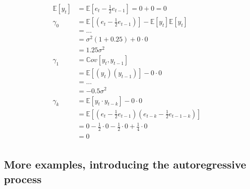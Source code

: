\begin{equation*}
    \begin{aligned}
        \mathbb{E}[y_t] &= \mathbb{E}[e_t - \frac{1}{2}e_{t-1}] = 0 + 0 = 0 \\
        \gamma_0 &= \mathbb{E}[\left( e_t - \frac{1}{2}e_{t-1}\right)] - \mathbb{E}[y_t] \mathbb{E}[y_t]  \\
                 &= \dots \\
                 &= \sigma^2(1 + 0.25) + 0 \cdot 0 \\
                 &= 1.25 \sigma^2 \\
        \gamma_1 &= \mathbb{C}ov[y_t, y_{t-1}] \\
                 &= \mathbb{E}[\left( y_t \right) \left( y_{t-1}\right)] -
                 0 \cdot 0\\
                 &= \dots \\
                 &= -0.5\sigma^2 \\
        \gamma_k &= \mathbb{E}[y_t \cdot y_{t-k}]  - 0 \cdot 0\\
                 &= \mathbb{E}[\left( e_t - \frac{1}{2}e_{t-1} \right) \left(
                 e_{t-k} - \frac{1}{2}e_{t-1-k} \right)] \\
                 &= 0 - \frac{1}{2} \cdot 0 - \frac{1}{2} \cdot  0 +
                 \frac{1}{4} \cdot 0 \\
                 &= 0\\
    \end{aligned}
\end{equation*}

\subsection{More examples, introducing the autoregressive process}

